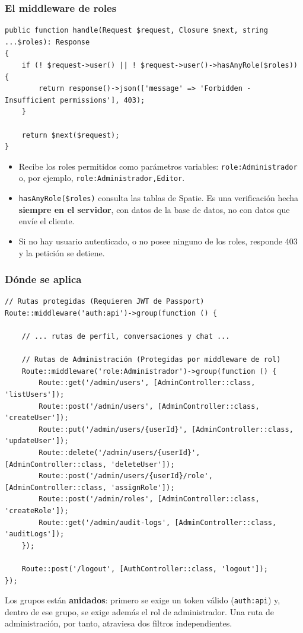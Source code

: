 \subsubsection{El middleware de roles}
\begin{lstlisting}[caption={app/Http/Middleware/RoleMiddleware.php}]
public function handle(Request $request, Closure $next, string ...$roles): Response
{
    if (! $request->user() || ! $request->user()->hasAnyRole($roles)) {
        return response()->json(['message' => 'Forbidden - Insufficient permissions'], 403);
    }

    return $next($request);
}
\end{lstlisting}
\begin{itemize}
    \item Recibe los roles permitidos como parámetros variables: \texttt{role:Administrador} o, por ejemplo, \texttt{role:Administrador,Editor}.
    \item \texttt{hasAnyRole(\$roles)} consulta las tablas de Spatie. Es una verificación hecha \textbf{siempre en el servidor}, con datos de la base de datos, no con datos que envíe el cliente.
    \item Si no hay usuario autenticado, o no posee ninguno de los roles, responde 403 y la petición se detiene.
\end{itemize}

\subsubsection{Dónde se aplica}
\begin{lstlisting}[caption={routes/api.php (fragmento)}]
// Rutas protegidas (Requieren JWT de Passport)
Route::middleware('auth:api')->group(function () {

    // ... rutas de perfil, conversaciones y chat ...

    // Rutas de Administración (Protegidas por middleware de rol)
    Route::middleware('role:Administrador')->group(function () {
        Route::get('/admin/users', [AdminController::class, 'listUsers']);
        Route::post('/admin/users', [AdminController::class, 'createUser']);
        Route::put('/admin/users/{userId}', [AdminController::class, 'updateUser']);
        Route::delete('/admin/users/{userId}', [AdminController::class, 'deleteUser']);
        Route::post('/admin/users/{userId}/role', [AdminController::class, 'assignRole']);
        Route::post('/admin/roles', [AdminController::class, 'createRole']);
        Route::get('/admin/audit-logs', [AdminController::class, 'auditLogs']);
    });

    Route::post('/logout', [AuthController::class, 'logout']);
});
\end{lstlisting}
Los grupos están \textbf{anidados}: primero se exige un token válido (\texttt{auth:api}) y, dentro de ese grupo, se exige además el rol de administrador. Una ruta de administración, por tanto, atraviesa dos filtros independientes.

